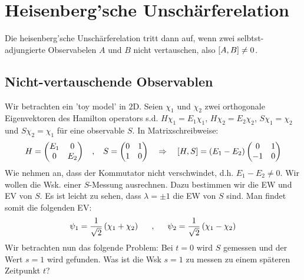 \section{Heisenberg'sche Unschärferelation}

Die heisenberg'sche Unschärferelation tritt dann auf, wenn zwei selbtst-adjungierte
Observabelen $A$ und $B$ nicht vertauschen, also $\left[ A,B \right] \neq 0$.

\subsection{Nicht-vertauschende Observablen}

Wir betrachten ein 'toy model' in $2$D. Seien $\chi_1$ und $\chi_2$ zwei
orthogonale Eigenvektoren des Hamilton operators s.d. $H \chi_1 = E_1 \chi_1$,
$H \chi_2 = E_2 \chi_2$, $S \chi_1 = \chi_2$ und $S \chi_2 = \chi_1$ für eine
observable $S$. In Matrixschreibweise:
\begin{align*}
    H = \begin{pmatrix}
        E_1 & 0 \\ 0 & E_2
    \end{pmatrix}
    \hspace{9pt} , \hspace{9pt}
    S = \begin{pmatrix}
        0 & 1 \\ 1 & 0
    \end{pmatrix}
    \hspace{10pt} \Rightarrow \hspace{10pt}
    \left[ H,S \right] = (E_1 - E_2) \begin{pmatrix}
        0 & 1 \\ -1 & 0
    \end{pmatrix}
\end{align*}
Wie nehmen an, dass der Kommutator nicht verschwindet, d.h. $E_1 - E_2 \neq 0$.
Wir wollen die Wsk. einer $S$-Messung ausrechnen. Dazu bestimmen wir die EW und EV
von $S$. Es ist leicht zu sehen, dass $\lambda = \pm 1$ die EW von $S$ sind. Man
findet somit die folgenden EV:
\begin{align*}
    \psi_1 = \frac{1}{\sqrt{2}} \left( \chi_1 + \chi_2 \right)
    \hspace{15pt} , \hspace{15pt}
    \psi_2 = \frac{1}{\sqrt{2}} \left( \chi_1 - \chi_2 \right)
\end{align*}
Wir betrachten nun das folgende Problem: Bei $t=0$ wird $S$ gemessen und der
Wert $s=1$ wird gefunden. Was ist die Wsk $s=1$ zu messen zu einem späteren Zeitpunkt
$t$?

